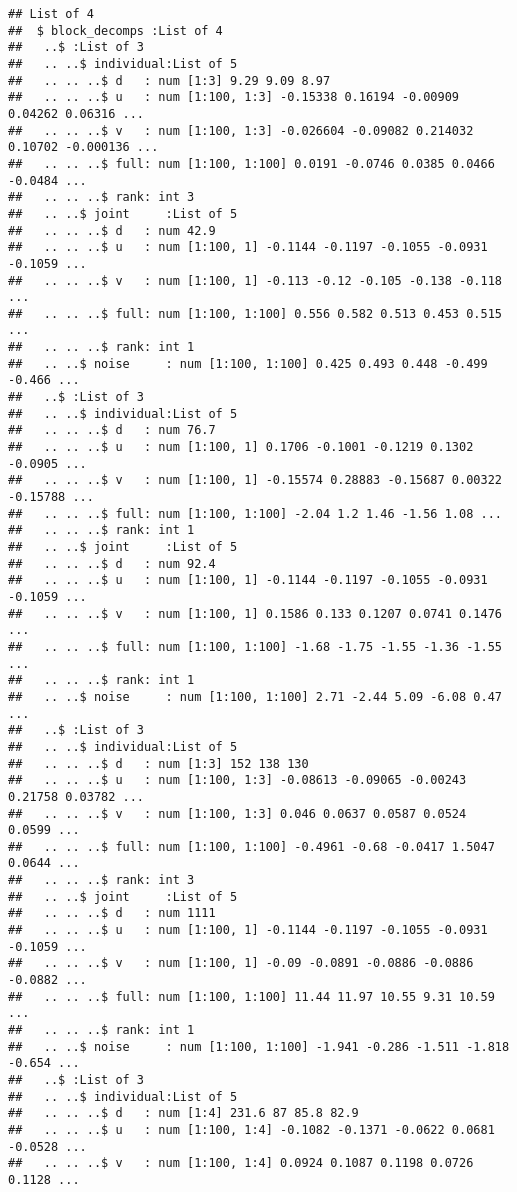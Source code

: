 \documentclass[
]{article}
\begin{document}
\begin{verbatim}
## List of 4
##  $ block_decomps :List of 4
##   ..$ :List of 3
##   .. ..$ individual:List of 5
##   .. .. ..$ d   : num [1:3] 9.29 9.09 8.97
##   .. .. ..$ u   : num [1:100, 1:3] -0.15338 0.16194 -0.00909 0.04262 0.06316 ...
##   .. .. ..$ v   : num [1:100, 1:3] -0.026604 -0.09082 0.214032 0.10702 -0.000136 ...
##   .. .. ..$ full: num [1:100, 1:100] 0.0191 -0.0746 0.0385 0.0466 -0.0484 ...
##   .. .. ..$ rank: int 3
##   .. ..$ joint     :List of 5
##   .. .. ..$ d   : num 42.9
##   .. .. ..$ u   : num [1:100, 1] -0.1144 -0.1197 -0.1055 -0.0931 -0.1059 ...
##   .. .. ..$ v   : num [1:100, 1] -0.113 -0.12 -0.105 -0.138 -0.118 ...
##   .. .. ..$ full: num [1:100, 1:100] 0.556 0.582 0.513 0.453 0.515 ...
##   .. .. ..$ rank: int 1
##   .. ..$ noise     : num [1:100, 1:100] 0.425 0.493 0.448 -0.499 -0.466 ...
##   ..$ :List of 3
##   .. ..$ individual:List of 5
##   .. .. ..$ d   : num 76.7
##   .. .. ..$ u   : num [1:100, 1] 0.1706 -0.1001 -0.1219 0.1302 -0.0905 ...
##   .. .. ..$ v   : num [1:100, 1] -0.15574 0.28883 -0.15687 0.00322 -0.15788 ...
##   .. .. ..$ full: num [1:100, 1:100] -2.04 1.2 1.46 -1.56 1.08 ...
##   .. .. ..$ rank: int 1
##   .. ..$ joint     :List of 5
##   .. .. ..$ d   : num 92.4
##   .. .. ..$ u   : num [1:100, 1] -0.1144 -0.1197 -0.1055 -0.0931 -0.1059 ...
##   .. .. ..$ v   : num [1:100, 1] 0.1586 0.133 0.1207 0.0741 0.1476 ...
##   .. .. ..$ full: num [1:100, 1:100] -1.68 -1.75 -1.55 -1.36 -1.55 ...
##   .. .. ..$ rank: int 1
##   .. ..$ noise     : num [1:100, 1:100] 2.71 -2.44 5.09 -6.08 0.47 ...
##   ..$ :List of 3
##   .. ..$ individual:List of 5
##   .. .. ..$ d   : num [1:3] 152 138 130
##   .. .. ..$ u   : num [1:100, 1:3] -0.08613 -0.09065 -0.00243 0.21758 0.03782 ...
##   .. .. ..$ v   : num [1:100, 1:3] 0.046 0.0637 0.0587 0.0524 0.0599 ...
##   .. .. ..$ full: num [1:100, 1:100] -0.4961 -0.68 -0.0417 1.5047 0.0644 ...
##   .. .. ..$ rank: int 3
##   .. ..$ joint     :List of 5
##   .. .. ..$ d   : num 1111
##   .. .. ..$ u   : num [1:100, 1] -0.1144 -0.1197 -0.1055 -0.0931 -0.1059 ...
##   .. .. ..$ v   : num [1:100, 1] -0.09 -0.0891 -0.0886 -0.0886 -0.0882 ...
##   .. .. ..$ full: num [1:100, 1:100] 11.44 11.97 10.55 9.31 10.59 ...
##   .. .. ..$ rank: int 1
##   .. ..$ noise     : num [1:100, 1:100] -1.941 -0.286 -1.511 -1.818 -0.654 ...
##   ..$ :List of 3
##   .. ..$ individual:List of 5
##   .. .. ..$ d   : num [1:4] 231.6 87 85.8 82.9
##   .. .. ..$ u   : num [1:100, 1:4] -0.1082 -0.1371 -0.0622 0.0681 -0.0528 ...
##   .. .. ..$ v   : num [1:100, 1:4] 0.0924 0.1087 0.1198 0.0726 0.1128 ...

\end{verbatim}
\end{document}
